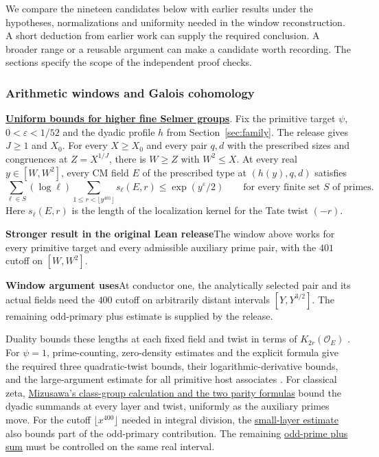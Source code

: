 \documentclass[11pt,a4paper]{article}
\newcommand{\rhscopelabel}[2]{%
  {\setlength{\fboxsep}{2pt}\colorbox{#1}{%
    \small\sffamily\bfseries\color{PageInk}#2}}}
\newcommand{\rhrange}[3][Stronger result in the original Lean release]{%
  \par\addvspace{.45\baselineskip}\Needspace{4\baselineskip}%
  \begingroup\setlength{\leftskip}{.65em}\setlength{\parindent}{0pt}%
  \noindent\rhscopelabel{TraceTint}{#1}\enspace#2\par
  \nobreak\smallskip
  \noindent\rhscopelabel{FieldTint}{Window argument uses}\enspace#3\par
  \endgroup\addvspace{.45\baselineskip}}
\begin{document}
We compare the nineteen candidates below with earlier results under
the hypotheses, normalizations and uniformity needed in the window
reconstruction. A short deduction from earlier work can supply the
required conclusion. A broader range or a reusable argument can make
a candidate worth recording. The sections specify the scope of the
independent proof checks.

\subsubsection*{Arithmetic windows and Galois cohomology}
\noindent\textbf{\hyperlink{candidate.family}{Uniform bounds for higher fine Selmer groups}}.
Fix the primitive target \(\psi\), \(0<\varepsilon<1/52\) and the
dyadic profile \(h\) from Section~\ref{sec:family}. The release gives
\(J\ge1\) and \(X_0\). For every \(X\ge X_0\) and every pair \(q,d\)
with the prescribed sizes and congruences at \(Z=X^{1/J}\), there is
\(W\ge Z\) with \(W^2\le X\). At every real \(y\in[W,W^2]\), every
CM field \(E\) of the prescribed type at \((h(y),q,d)\) satisfies
\[
 \sum_{\ell\in S}(\log\ell)
   \sum_{1\le r<\lfloor y^{401}\rfloor}s_\ell(E,r)
   \le \exp(y^\varepsilon/2)
 \qquad\text{for every finite set \(S\) of primes}.
\]
Here \(s_\ell(E,r)\) is the length of the localization kernel for the
Tate twist \((-r)\).
\rhrange{The window above works for every primitive target and every
admissible auxiliary prime pair, with the \(401\) cutoff on \([W,W^2]\).}
{At conductor one, the analytically selected pair and its actual
fields need the \(400\) cutoff on arbitrarily distant intervals
\([Y,Y^{3/2}]\). The remaining odd-primary plus estimate is supplied
by the release.}
Duality bounds these lengths at each fixed field
and twist in terms of \(K_{2r}(\mathcal O_E)\)
\cite{f1milne-adt,f1weibel-kbook}. For \(\psi=1\), prime-counting,
zero-density estimates and the explicit formula give the required three
quadratic-twist bounds, their logarithmic-derivative bounds, and the
large-argument estimate for all primitive host associates
\cite{f1thorner-zaman,f1thorner-zaman-density,f1heath-brown,f1ihara-murty-shimura}.
For classical zeta, \hyperlink{proof.selmer-classical-all-layers}{Mizusawa's class-group
calculation and the two parity formulas} bound the dyadic summands at
every layer and twist, uniformly as the auxiliary primes move.
For the cutoff \(\lfloor x^{400}\rfloor\) needed in integral division,
the \hyperlink{proof.selmer-classical-low-layer}{small-layer estimate}
also bounds part of the odd-primary contribution. The remaining
\hyperlink{proof.selmer-classical-residual}{odd-prime plus sum}
must be controlled on the same real interval.
\end{document}
